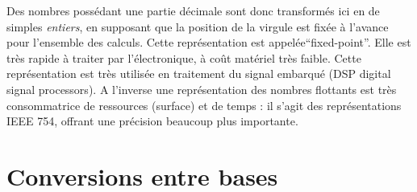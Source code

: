 \documentclass[a4paper,11pt]{article}
\begin{document}
Des nombres possédant une partie décimale sont donc transformés ici en de simples {\it entiers}, en supposant que la position de la virgule est fixée à l'avance pour l'ensemble des calculs. Cette représentation est appelée``fixed-point''. Elle est très rapide à traiter par l'électronique, à coût matériel très faible. Cette représentation est très utilisée en traitement du signal embarqué (DSP digital signal processors). A l'inverse une représentation des nombres flottants est très consommatrice de ressources (surface) et de temps : il s'agit des représentations IEEE 754, offrant une précision beaucoup plus importante.

\section{Conversions entre bases}
\end{document}
